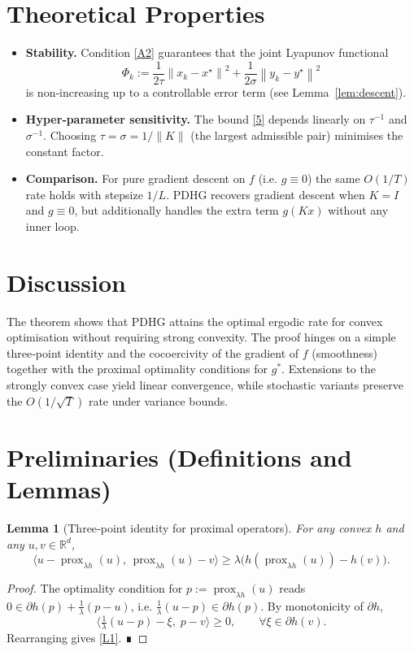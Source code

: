 \documentclass{article}
\newtheorem{lemma}{Lemma}
\newcommand{\norm}[1]{\left\lVert#1\right\rVert}
\begin{document}
\section*{Theoretical Properties}
\begin{itemize}
\item \textbf{Stability.} Condition \eqref{A2} guarantees that the joint Lyapunov functional
\[
\Phi_{k}:=\frac{1}{2\tau}\norm{x_{k}-x^{\star}}^{2}+\frac{1}{2\sigma}\norm{y_{k}-y^{\star}}^{2}
\]
is non‑increasing up to a controllable error term (see Lemma~\ref{lem:descent}).
\item \textbf{Hyper‑parameter sensitivity.} The bound \eqref{5} depends linearly on $\tau^{-1}$ and $\sigma^{-1}$. Choosing $\tau=\sigma=1/\|K\|$ (the largest admissible pair) minimises the constant factor.
\item \textbf{Comparison.} For pure gradient descent on $f$ (i.e. $g\equiv0$) the same $O(1/T)$ rate holds with stepsize $1/L$. PDHG recovers gradient descent when $K=I$ and $g\equiv0$, but additionally handles the extra term $g(Kx)$ without any inner loop.
\end{itemize}

\section*{Discussion}
The theorem shows that PDHG attains the optimal ergodic rate for convex optimisation without requiring strong convexity. The proof hinges on a simple three‑point identity and the cocoercivity of the gradient of $f$ (smoothness) together with the proximal optimality conditions for $g^{*}$. Extensions to the strongly convex case yield linear convergence, while stochastic variants preserve the $O(1/\sqrt{T})$ rate under variance bounds.

\newpage
\section*{Preliminaries (Definitions and Lemmas)}
\begin{lemma}[Three‑point identity for proximal operators]\label{lem:prox}
For any convex $h$ and any $u,v\in\mathbb R^{d}$,
\[
\langle u-\operatorname{prox}_{\lambda h}(u),\,\operatorname{prox}_{\lambda h}(u)-v\rangle
\ge \lambda\bigl(h(\operatorname{prox}_{\lambda h}(u))-h(v)\bigr).
\tag{L1}
\]
\end{lemma}
\begin{proof}
The optimality condition for $p:=\operatorname{prox}_{\lambda h}(u)$ reads  
$0\in \partial h(p)+\frac{1}{\lambda}(p-u)$, i.e.  
$\frac{1}{\lambda}(u-p)\in\partial h(p)$. By monotonicity of $\partial h$,
\[
\big\langle \tfrac{1}{\lambda}(u-p)-\xi,\;p-v\big\rangle\ge0,\qquad\forall \xi\in\partial h(v).
\]
Rearranging gives \eqref{L1}. ∎
\end{proof}
\end{document}
